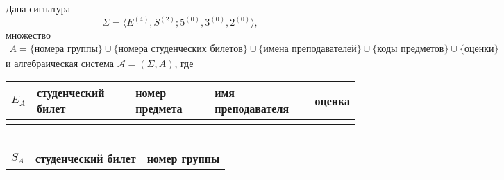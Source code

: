 \documentclass[12pt]{article}
\begin{document}
\delimitershortfall=-1pt
Дана сигнатура 
$$\Sigma = \langle E^{(4)},S^{(2)};5^{(0)},3^{(0)},2^{(0)}\rangle,$$ 
множество 
\begin{multline*}
A=\{\text{номера группы}\}\cup\{\text{номера студенческих билетов}\}\cup
\{\text{имена преподавателей}\}\cup\{\text{коды предметов}\}\cup\{\text{оценки}\}
\end{multline*}
и алгебраическая система $\mathcal{A}=(\Sigma,A)$, где
\begin{table}[h]
\begin{tabular}{|c|m{3cm}|m{3cm}|m{3cm}|c|}
\hline 
$E_A$ & студенческий билет & номер предмета & имя преподавателя & оценка\\[2ex]
\hline 
 &  &  &  &  \\ 
\hline 
\end{tabular}$\quad$ 
\end{table}
\begin{table}[h]
\begin{tabular}{|c|m{3cm}|c|}
\hline 
$S_A$ & студенческий билет & номер группы \\[2ex]
\hline 
 &  &   \\ 
\hline 
\end{tabular}$\quad$ 
\end{table}
\end{document}

